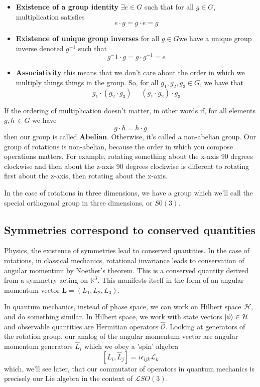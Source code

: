 \documentclass[11pt, oneside]{article}   	%
\theoremstyle{slanted}
\begin{document}
\begin{itemize} 
	\item \textbf{Existence of a group identity }  $ \exists e \in G $ such that for all $g \in G$, multiplication satisfies 
	\[ e \cdot g = g \cdot e = g \] 
	\item \textbf{Existence of unique group inverses } for all $g \in G$we have a unique group inverse denoted $g^{ -1}$ such that 
\[ g^-1 \cdot g = g \cdot g^{ -1}  = e \] 
	\item \textbf{Associativity } this means that we don't care about the order in which we multiply things things in the group. So, for all $g_1, g_2, g_3 \in G$, we have that 
\[ 
	g_1 \cdot (g_2 \cdot g_3)  = (g_1 \cdot g_2 ) \cdot g_3 
\] 
\end{itemize} 
If the ordering of multiplication doesn't matter, in other words if, for all elements $g, h \, \in G$ we have 
\[ 
	g \cdot h  = h \cdot g 
\] 
then our group is called \textbf{Abelian}. Otherwise, it's called a non-abelian group. Our group of rotations is non-abelian, because the order in which you compose operations matters. For example, rotating something about the x-axis 90 degrees clockwise and then about the z-axis 90 degrees clockwise is different to rotating first about the z-axis, then rotating about the x-axis. 

In the case of rotations in three dimensions, we have a group which we'll call the special orthogonal group in three dimensions, or $S0(3) $. 
\subsection{Symmetries correspond to conserved quantities}  
Physics, the existence of symmetries lead to conserved quantities. In the case of rotations, in classical mechanics, rotational invariance leads to conservation of angular momentum by Noether's theorem. This is a conserved quantity derived from a symmetry acting on $\mathbb{R}^3 $. This manifests itself in the form of an angular momentum vector $\mathbf{L }  = (L_1, L_2, L_3 )$.  

In quantum mechanics, instead of phase space, we can work on Hilbert space $\mathcal{H}$, and do something similar. In Hilbert space, we work with state vectors $\ket{ \phi} \in \mathcal{H}$ and observable quantities are Hermitian operators $\hat{ \mathcal{ O }} $. Looking at generators of the rotation group, our analog of the angular momentum vector are angular momentum generators $\hat{ L}_i$ which we obey a 'spin' algebra 
\[
	 [\hat{L}_i, \hat{L}_j ] = i \epsilon_{ ijk} \mathcal{L}_k
\] 
which, we'll see later, that our commutator of operators in quantum mechanics is precisely our Lie algebra in the context of $\mathcal{ L }SO( 3)$. 
\end{document}

